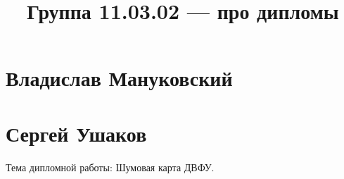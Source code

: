 \documentclass{article}
\title{Группа 11.03.02 --- про дипломы}
\begin{document}
\section*{Владислав Мануковский}

\section*{Сергей Ушаков}

Тема дипломной работы: Шумовая карта ДВФУ.
\end{document}
